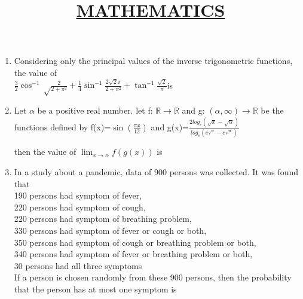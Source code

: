\documentclass{article}
\title{\underline{\textbf{MATHEMATICS}}}
\date{}
\begin{document}
\maketitle
\begin{enumerate}
		

	\item Considering only the principal values of the inverse trigonometric functions, the value of\\
		$\frac{3}{2} \cos^{-1} \sqrt\frac{2}{2+\pi^{2}} + \frac{1}{4} \sin^{-1}\frac{2\sqrt{2}\pi}{2+\pi^{2}} + \tan^{-1}\frac{\sqrt{2}}{\pi}$is \underline{\hspace{2cm}} \\
\medskip


	\item Let $\alpha$ be a positive real number. let f: $\mathbb{R} \to \mathbb{R}$ and g: $(\alpha, \infty) \to \mathbb{R}$ be the functions defined by 
		f(x)=$\sin(\frac{\pi x}{12})$ and g(x)=$\frac{2log_e(\sqrt{x}-\sqrt{\alpha})}{log_e(e^{\sqrt{x}}-e^{\sqrt{\alpha}})}$

		then the value of $\lim_{x \to \alpha}f(g(x))$ is 
\underline{\hspace{2cm}}\\
\medskip
	
	\item In a study about a pandemic, data of 900 persons was collected. It was found that\\ 

		190 persons had symptom of fever, \\
		220 persons had symptom of cough, \\
		220 persons had symptom of breathing problem, \\
		330 persons had symptom of fever or cough or both,\\ 
		350 persons had symptom of cough or breathing problem or both, \\
		340 persons had symptom of fever or breathing problem or both, \\
		30 persons had all three symptoms \\

	If a person is chosen randomly from these 900 persons, then the probability that the person has at 
most one symptom is      \underline{\hspace{2cm}}\\
\medskip


\end{enumerate}
\end{document}
